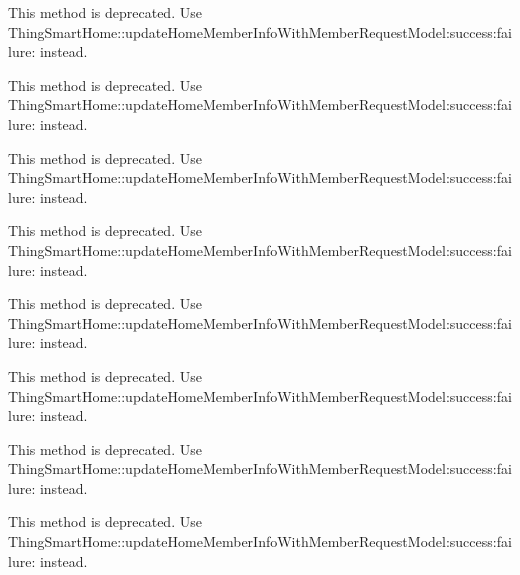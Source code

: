 \begin{DoxyRefList}
\label{deprecated__deprecated000016}%
%
This method is deprecated. Use Thing\+Smart\+Home\+::update\+Home\+Member\+Info\+With\+Member\+Request\+Model\+:success\+:failure\+: instead. 

\label{deprecated__deprecated000052}%
%
This method is deprecated. Use Thing\+Smart\+Home\+::update\+Home\+Member\+Info\+With\+Member\+Request\+Model\+:success\+:failure\+: instead.  
\item[(Thing\+Deprecated\+Api) Member \mbox{\hyperlink{category_thing_smart_home_member_07_thing_deprecated_api_08_a193ce4c46d7b971eb2136063b42c2d1b}{\mbox{[}Thing\+Smart\+Home\+Member(Thing\+Deprecated\+Api) update\+Home\+Member\+Head\+Pic\+With\+Member\+Id\+:head\+Pic\+:is\+Admin\+:success\+:failure\+:\mbox{]}}} ]\label{deprecated__deprecated000033}%
%
This method is deprecated. Use Thing\+Smart\+Home\+::update\+Home\+Member\+Info\+With\+Member\+Request\+Model\+:success\+:failure\+: instead. 

\label{deprecated__deprecated000051}%
%
This method is deprecated. Use Thing\+Smart\+Home\+::update\+Home\+Member\+Info\+With\+Member\+Request\+Model\+:success\+:failure\+: instead. 

\label{deprecated__deprecated000015}%
%
This method is deprecated. Use Thing\+Smart\+Home\+::update\+Home\+Member\+Info\+With\+Member\+Request\+Model\+:success\+:failure\+: instead. 

\label{deprecated__deprecated000069}%
%
This method is deprecated. Use Thing\+Smart\+Home\+::update\+Home\+Member\+Info\+With\+Member\+Request\+Model\+:success\+:failure\+: instead.  
\item[(Thing\+Deprecated\+Api) Member \mbox{\hyperlink{category_thing_smart_home_member_07_thing_deprecated_api_08_a95e85754d143538c306d62699f8e8599}{\mbox{[}Thing\+Smart\+Home\+Member(Thing\+Deprecated\+Api) update\+Home\+Member\+Info\+With\+Member\+Id\+:name\+:head\+Pic\+:is\+Admin\+:success\+:failure\+:\mbox{]}}} ]\label{deprecated__deprecated000013}%
%
This method is deprecated. Use Thing\+Smart\+Home\+::update\+Home\+Member\+Info\+With\+Member\+Request\+Model\+:success\+:failure\+: instead. 

\label{deprecated__deprecated000049}%
%
This method is deprecated. Use Thing\+Smart\+Home\+::update\+Home\+Member\+Info\+With\+Member\+Request\+Model\+:success\+:failure\+: instead. 


\end{DoxyRefList}
